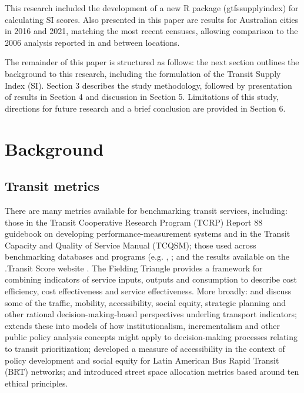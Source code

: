 \documentclass[preprint, 3p,
authoryear]{elsarticle} %
\begin{document}
This research included the development of a new R package
(gtfssupplyindex) for calculating SI scores. Also presented in this
paper are results for Australian cities in 2016 and 2021, matching the
most recent censuses, allowing comparison to the 2006 analysis reported
in \citet{currie2010identifying} and between locations.

The remainder of this paper is structured as follows: the next section
outlines the background to this research, including the formulation of
the Transit Supply Index (SI). Section 3 describes the study
methodology, followed by presentation of results in Section 4 and
discussion in Section 5. Limitations of this study, directions for
future research and a brief conclusion are provided in Section 6.

\section{Background}\label{background}

\subsection{Transit metrics}\label{transit-metrics}

There are many metrics available for benchmarking transit services,
including: those in the Transit Cooperative Research Program (TCRP)
Report 88 guidebook on developing performance-measurement systems
\citep{Ryus:2003aa} and in the Transit Capacity and Quality of Service
Manual (TCQSM)\citep{TCQSM:2013}; those used across benchmarking
databases and programs (e.g.
\citet{Florida-Transit-Information-System:2018aa}, \citet{UITP:2015aa}
\citet{Imperial-College-London:2023aa}; and the results available on the
.Transit Score website \citep{WalkScore:2023tg}. The Fielding Triangle
\citep{FieldingGordonJ1987Mpts} provides a framework for combining
indicators of service inputs, outputs and consumption to describe cost
efficiency, cost effectiveness and service effectiveness. More broadly:
\citet{Litman:2003ab} and \citet{Litman:2016aa} discuss some of the
traffic, mobility, accessibility, social equity, strategic planning and
other rational decision-making-based perspectives underling transport
indicators; \citet{Reynolds:2017ah} extends these into models of how
institutionalism, incrementalism and other public policy analysis
concepts might apply to decision-making processes relating to transit
prioritization; \citet{GuzmanLuisA.2017Aeit} developed a measure of
accessibility in the context of policy development and social equity for
Latin American Bus Rapid Transit (BRT) networks; and
\citet{Creutzig2020streetspaceallocation} introduced street space
allocation metrics based around ten ethical principles.
\end{document}

